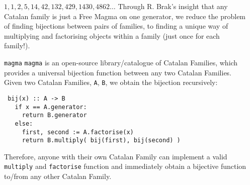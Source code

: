\documentclass[final]{beamer}
\newlength{\sepwidth}
\newlength{\colwidth}
\newcommand{\separatorcolumn}{\begin{column}{\sepwidth}\end{column}}
\newcommand{\getTri}[1]{\begin{tikzpicture}[line width=2pt, radius=3pt]\getdata{#1}\triangulations\end{tikzpicture}}
\newcommand{\getSP}[1]{\begin{tikzpicture}[line width=2.5pt, radius=4pt, scale=0.75]\getdata{#1}\staircasePolygons\end{tikzpicture}}
\newcommand{\getCBT}[1]{\scalebox{0.5}{\getdata{#1}\CBTs}}
\newcommand{\getArch}[1]{\begin{tikzpicture}[line width=2pt, radius=4pt, scale=0.75]\getdata{#1}\linkDiagrams\end{tikzpicture}}
\begin{document}
\begin{frame}[t]
\begin{columns}[t]
\begin{column}{\colwidth}
\begin{block}{$1, 1, 2, 5, 14, 42, 132, 429, 1430, 4862\dots$}
    Through R. Brak's insight that any Catalan family is just a Free Magma on one generator, we reduce the problem of finding bijections between pairs of families, to finding a unique way of multiplying and factorising objects within a family (just once for each family!). 
  \end{block}

  \begin{alertblock}{\texttt{magma}}
    \texttt{magma} is an open-source library/catalogue of Catalan Families, which provides a universal bijection function between any two Catalan Families. Given two Catalan Families, \texttt{A}, \texttt{B}, we obtain the bijection recursively:
    
    \texttt{
    bij(x) :: A -> B\\
    ~~~if x == A.generator:\\
    ~~~~~return B.generator\\
    ~~~else:\\
    ~~~~~first, second := A.factorise(x)\\
    ~~~~~return B.multiply( bij(first), bij(second) )}

    Therefore, anyone with their own Catalan Family can implement a valid \texttt{multiply} and \texttt{factorise} function and immediately obtain a bijective function to/from any other Catalan Family.
  \end{alertblock}

\end{column}

\separatorcolumn
\end{columns}


  
    
\end{frame}
\end{document}
